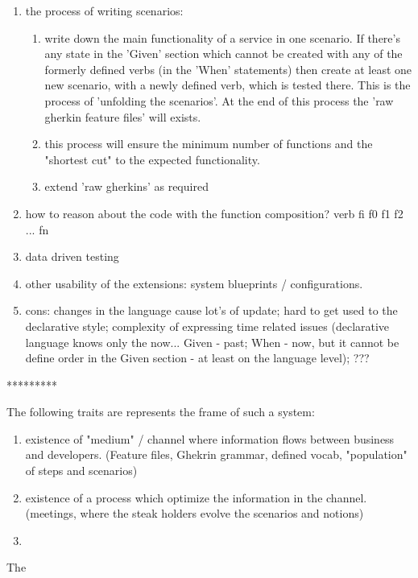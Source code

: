 \documentclass[conference]{IEEEtran}
\begin{document}
\begin{enumerate}
\begin{enumerate}
        \end{enumerate}
    \item the process of writing scenarios:
        \begin{enumerate}
            \item write down the main functionality of a service in one scenario. If there's any state in the 'Given' section which cannot be created with any of the formerly defined verbs (in the 'When' statements) then create at least one new scenario, with a newly defined verb, which is tested there. This is the process of 'unfolding the scenarios'. At the end of this process the 'raw gherkin feature files' will exists.
            \item this process will ensure the minimum number of functions and the "shortest cut" to the expected functionality.
            \item extend 'raw gherkins' as required
        \end{enumerate}
    \item how to reason about the code with the function composition? verb  \Rightarrow fi \Rightarrow f0 \circ f1 \circ f2 \circ ... \circ fn
    \item data driven testing
    \item other usability of the extensions: system blueprints / configurations.
    \item cons: changes in the language cause lot's of update; hard to get used to the declarative style; complexity of expressing time related issues (declarative language knows only the now... Given - past; When - now, but it cannot be define order in the Given section - at least on the language level); ???
\end{enumerate}


*********

The following traits are represents the frame of such a system:
\begin{enumerate}
  \item existence of "medium" / channel where information flows between business and developers. (Feature files, Ghekrin grammar, defined vocab, "population" of steps and scenarios)
  \item existence of a process which optimize the information in the channel. (meetings, where the steak holders evolve the scenarios and notions)
  \item 
\end{enumerate}

The 
\end{document}
